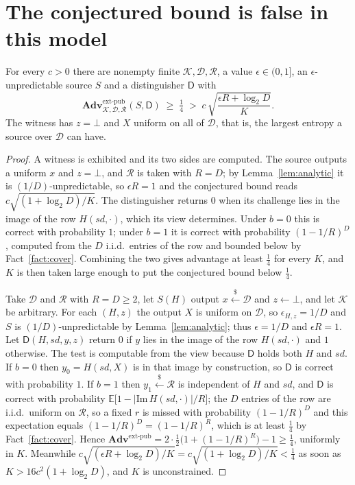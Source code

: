 \documentclass{aicr-solution}
\newcommand{\Adv}{\mathbf{Adv}}
\newcommand{\extp}{\mathrm{ext}\text{-}\mathrm{pub}}
\newcommand{\sd}{\mathit{sd}}
\renewcommand{\sample}{\stackrel{{\scriptscriptstyle\$}}{\leftarrow}}
\newcommand{\calK}{\mathcal{K}}
\newcommand{\calD}{\mathcal{D}}
\newcommand{\calR}{\mathcal{R}}
\begin{document}
\section{The conjectured bound is false in this model}\label{sec:false}

\begin{proposition}\label{prop:false}
For every $c > 0$ there are nonempty finite $\calK, \calD, \calR$, a value $\epsilon \in (0,1]$, an
$\epsilon$-unpredictable source $S$ and a distinguisher $\mathsf{D}$ with
\[
  \Adv^{\extp}_{\calK,\calD,\calR}(S,\mathsf{D}) \;\ge\; \tfrac14
  \;>\; c\,\sqrt{\frac{\epsilon R + \log_2 D}{K}} .
\]
The witness has $z = \bot$ and $X$ uniform on all of $\calD$, that is, the largest entropy a
source over $\calD$ can have.
\end{proposition}

\begin{proof}
A witness is exhibited and its two sides are computed. The source outputs a uniform $x$ and
$z = \bot$, and $\calR$ is taken with $R = D$; by Lemma~\ref{lem:analytic} it is
$(1/D)$-unpredictable, so $\epsilon R = 1$ and the conjectured bound reads
$c\sqrt{(1+\log_2 D)/K}$. The distinguisher returns $0$ when its challenge lies in the image of the
row $H(\sd,\cdot)$, which its view determines. Under $b = 0$ this is correct with probability $1$;
under $b = 1$ it is correct with probability $(1-1/R)^{D}$, computed from the $D$ i.i.d.\ entries
of the row and bounded below by Fact~\ref{fact:cover}. Combining the two gives advantage at least $\tfrac14$ for every $K$, and $K$ is then
taken large enough to put the conjectured bound below $\tfrac14$.

Take $\calD$ and $\calR$ with $R = D \ge 2$, let $S(H)$ output $x \sample \calD$ and
$z \leftarrow \bot$, and let $\calK$ be arbitrary. For each $(H,z)$ the output $X$ is uniform on
$\calD$, so $\epsilon_{H,z} = 1/D$ and $S$ is $(1/D)$-unpredictable by
Lemma~\ref{lem:analytic}; thus $\epsilon = 1/D$ and $\epsilon R = 1$. Let $\mathsf{D}(H,\sd,y,z)$
return $0$ if $y$ lies in the image of the row $H(\sd,\cdot)$ and $1$ otherwise. The test is
computable from the view because $\mathsf{D}$ holds both $H$ and $\sd$. If $b = 0$ then
$y_0 = H(\sd,X)$ is in that image by construction, so $\mathsf{D}$ is correct with probability $1$.
If $b = 1$ then $y_1 \sample \calR$ is independent of $H$ and $\sd$, and $\mathsf{D}$ is correct
with probability $\mathbb{E}\bigl[1 - |\mathrm{Im}\,H(\sd,\cdot)|/R\bigr]$; the $D$ entries of the
row are i.i.d.\ uniform on $\calR$, so a fixed $r$ is missed with probability $(1-1/R)^{D}$ and this
expectation equals $(1-1/R)^{D} = (1-1/R)^{R}$, which is at least $\tfrac14$ by
Fact~\ref{fact:cover}. Hence
$\Adv^{\extp} = 2 \cdot \tfrac12\bigl(1 + (1-1/R)^{R}\bigr) - 1 \ge \tfrac14$, uniformly in $K$.
Meanwhile $c\sqrt{(\epsilon R + \log_2 D)/K} = c\sqrt{(1+\log_2 D)/K} < \tfrac14$ as soon as
$K > 16c^{2}(1 + \log_2 D)$, and $K$ is unconstrained.
\end{proof}
\end{document}
